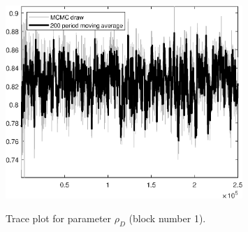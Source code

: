\begin{figure}[H]
\centering
  \includegraphics[width=0.8\textwidth]{BRS/graphs/TracePlot_rho_D_blck_1}\\
    \caption{Trace plot for parameter ${\rho_D}$ (block number 1).}
\end{figure}
